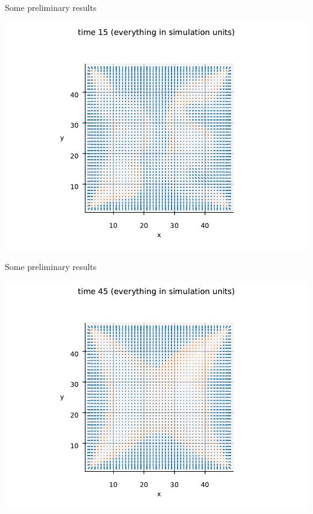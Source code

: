 \documentclass[10pt,notes]{beamer}
\begin{document}
\begin{frame}[fragile]{Some preliminary results}
    \newrefsection
    \begin{center}
        \includegraphics[width=\textwidth]{figures/prelim2.pdf}
    \end{center}
\end{frame}

\begin{frame}[fragile]{Some preliminary results}
    \newrefsection
    \begin{center}
        \includegraphics[width=\textwidth]{figures/prelim3.pdf}
    \end{center}
\end{frame}
\end{document}

